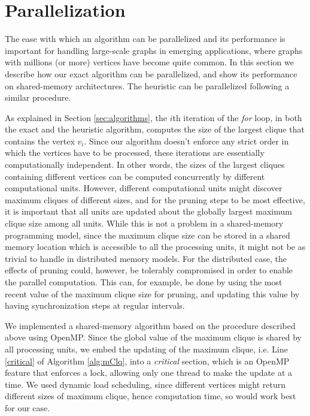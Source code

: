 \section{Parallelization}
\label{sec:parallelization}

The ease with which an algorithm can be parallelized and its performance is important for handling large-scale graphs in emerging applications, where graphs with millions (or more) vertices have become quite common. In this section we describe how our exact algorithm can be parallelized, and show its performance on shared-memory architectures. The heuristic can be parallelized following a similar procedure.

As explained in Section \ref{sec:algorithms}, the $i$th iteration of the {\em for} loop, in both the exact and the heuristic algorithm, computes the size of the largest clique that contains the vertex $v_i$. Since our algorithm doesn't enforce any strict order in which the vertices have to be processed, these iterations are essentially computationally independent. In other words, the sizes of the largest cliques containing different vertices can be computed concurrently by different computational units. However, different computational units might discover maximum cliques of different sizes, and for the pruning steps to be most effective, it is important that all units are updated about the globally largest maximum clique size among all units. While this is not a problem in a shared-memory programming model, since the maximum clique size can be stored in a shared memory location which is accessible to all the processing units, it might not be as trivial to handle in distributed memory models. For the distributed case, the effects of pruning could, however, be tolerably compromised in order to enable the parallel computation. This can, for example, be done by using the most recent value of the maximum clique size for pruning, and updating this value by having synchronization steps at regular intervals.

We implemented a shared-memory algorithm based on the procedure described above using OpenMP. Since the global value of the maximum clique is shared by all processing units, we embed the updating of the maximum clique, i.e. Line \ref{critical} of Algorithm \ref{alg:mClq}, into a {\it critical} section, which is an OpenMP feature that enforces a lock, allowing only one thread to make the update at a time. We used  dynamic load scheduling, since different vertices might return different sizes of maximum clique, hence computation time, so would work best for our case.

